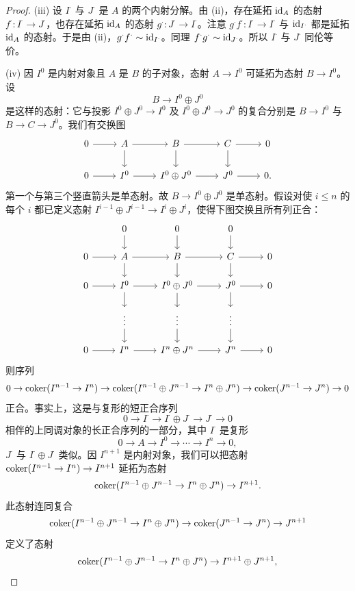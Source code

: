 \begin{proof}
(iii) 设 $I^\cdot$ 与 $J^\cdot$ 是 $A$ 的两个内射分解。由 (ii)，存在延拓 $\operatorname{id}_A$ 的态射 $f^\cdot\colon I^\cdot\to J^\cdot$，也存在延拓 $\operatorname{id}_A$ 的态射 $g^\cdot\colon J^\cdot\to I^\cdot$。注意 $g^\cdot f^\cdot\colon I^\cdot\to I^\cdot$ 与 $\operatorname{id}_{I^\cdot}$ 都是延拓 $\operatorname{id}_A$ 的态射。于是由 (ii)，$g^\cdot f^\cdot\sim\operatorname{id}_{I^\cdot}$。同理 $f^\cdot g^\cdot\sim\operatorname{id}_{J^\cdot}$。所以 $I^\cdot$ 与 $J^\cdot$ 同伦等价。

(iv) 因 $I^0$ 是内射对象且 $A$ 是 $B$ 的子对象，态射 $A\to I^0$ 可延拓为态射 $B\to I^0$。设
\[
B\to I^0\oplus J^0
\]
是这样的态射：它与投影 $I^0\oplus J^0\to I^0$ 及 $I^0\oplus J^0\to J^0$ 的复合分别是 $B\to I^0$ 与 $B\to C\to J^0$。我们有交换图
\[\begin{tikzcd}[column sep=2.4em,row sep=1.8em]
0 \arrow[r] & A \arrow[r] \arrow[d] & B \arrow[r] \arrow[d] & C \arrow[r] \arrow[d] & 0 \\
0 \arrow[r] & I^0 \arrow[r] & I^0\oplus J^0 \arrow[r] & J^0 \arrow[r] & 0.
\end{tikzcd}\]
第一个与第三个竖直箭头是单态射。故 $B\to I^0\oplus J^0$ 是单态射。假设对使 $i\le n$ 的每个 $i$ 都已定义态射 $I^{i-1}\oplus J^{i-1}\to I^i\oplus J^i$，使得下图交换且所有列正合：
\[\begin{tikzcd}[column sep=2.4em,row sep=1.5em]
& 0 \arrow[d] & 0 \arrow[d] & 0 \arrow[d] & \\
0 \arrow[r] & A \arrow[r] \arrow[d] & B \arrow[r] \arrow[d] & C \arrow[r] \arrow[d] & 0 \\
0 \arrow[r] & I^0 \arrow[r] \arrow[d] & I^0\oplus J^0 \arrow[r] \arrow[d] & J^0 \arrow[r] \arrow[d] & 0 \\
& \vdots \arrow[d] & \vdots \arrow[d] & \vdots \arrow[d] & \\
0 \arrow[r] & I^n \arrow[r] & I^n\oplus J^n \arrow[r] & J^n \arrow[r] & 0
\end{tikzcd}\]
则序列
\[
0\to\operatorname{coker}(I^{n-1}\to I^n)\to\operatorname{coker}(I^{n-1}\oplus J^{n-1}\to I^n\oplus J^n)\to\operatorname{coker}(J^{n-1}\to J^n)\to 0
\]
正合。事实上，这是与复形的短正合序列
\[
0\to I^\cdot\to I^\cdot\oplus J^\cdot\to J^\cdot\to 0
\]
相伴的上同调对象的长正合序列的一部分，其中 $I^\cdot$ 是复形
\[
0\to A\to I^0\to\cdots\to I^n\to 0,
\]
$J^\cdot$ 与 $I^\cdot\oplus J^\cdot$ 类似。因 $I^{n+1}$ 是内射对象，我们可以把态射 $\operatorname{coker}(I^{n-1}\to I^n)\to I^{n+1}$ 延拓为态射
\[
\operatorname{coker}(I^{n-1}\oplus J^{n-1}\to I^n\oplus J^n)\to I^{n+1}.
\]
此态射连同复合
\[
\operatorname{coker}(I^{n-1}\oplus J^{n-1}\to I^n\oplus J^n)\to\operatorname{coker}(J^{n-1}\to J^n)\to J^{n+1}
\]
定义了态射
\[
\operatorname{coker}(I^{n-1}\oplus J^{n-1}\to I^n\oplus J^n)\to I^{n+1}\oplus J^{n+1},
\]
\end{proof}
